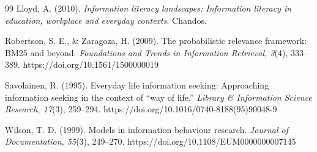 \documentclass{isi2027}
\begin{document}
\begin{thebibliography}{99}
Lloyd, A. (2010). \textit{Information literacy landscapes: Information literacy in education, workplace and everyday contexts}. Chandos.

Robertson, S. E., \& Zaragoza, H. (2009). The probabilistic relevance framework: BM25 and beyond. \textit{Foundations and Trends in Information Retrieval, 3}(4), 333--389. https://doi.org/10.1561/1500000019

Savolainen, R. (1995). Everyday life information seeking: Approaching information seeking in the context of ``way of life.'' \textit{Library \& Information Science Research, 17}(3), 259--294. https://doi.org/10.1016/0740-8188(95)90048-9

Wilson, T. D. (1999). Models in information behaviour research. \textit{Journal of Documentation, 55}(3), 249--270. https://doi.org/10.1108/EUM0000000007145
\end{thebibliography}
\end{document}
